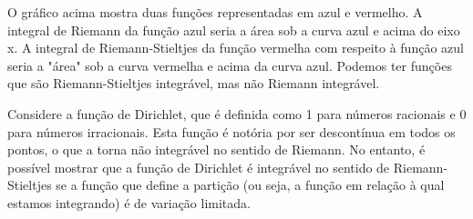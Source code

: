 \documentclass[Analysis/analysis_notes.tex]{subfiles}
\begin{document}

O gráfico acima mostra duas funções representadas em azul e vermelho.
A integral de Riemann da função azul seria a área sob a curva azul e acima
do eixo x. A integral de Riemann-Stieltjes da função vermelha com respeito à função
azul seria a "área" sob a curva vermelha e acima da curva azul. Podemos ter fun\c cões
que são Riemann-Stieltjes integrável, mas não Riemann integrável.

Considere a função de Dirichlet, que é definida como 1 para números racionais
e 0 para números irracionais. Esta função é notória por ser descontínua em todos
os pontos, o que a torna não integrável no sentido de Riemann.
No entanto, é possível mostrar que a função de Dirichlet é integrável no sentido
de Riemann-Stieltjes se a função que define a partição
(ou seja, a função em relação à qual estamos integrando) é de variação limitada.
\end{document}
